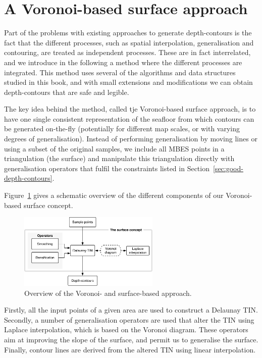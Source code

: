 %
\section{A Voronoi-based surface approach}

Part of the problems with existing approaches to generate depth-contours is the fact that the different processes, such as spatial interpolation, generalisation and contouring, are treated as independent processes.
These are in fact interrelated, and we introduce in the following a method where the different processes are integrated.
This method uses several of the algorithms and data structures studied in this book, and with small extensions and modifications we can obtain depth-contours that are safe and legible.

%

The key idea behind the method, called tje Voronoi-based surface approach, is to have one single consistent representation of the seafloor from which contours can be generated on-the-fly (potentially for different map scales, or with varying degrees of generalisation).
Instead of performing generalisation by moving lines or using a subset of the original samples, we include all MBES points in a triangulation (the surface) and manipulate this triangulation directly with generalisation operators that fulfil the constraints listed in Section~\ref{sec:good-depth-contours}.

%

Figure~\ref{fig:surfapproach} gives a schematic overview of the different components of our Voronoi-based surface concept. 
\begin{figure}
  \centering
  \includegraphics[width=0.6\textwidth]{figs/surfaceapproach_V2.pdf}
  \caption{Overview of the Voronoi- and surface-based approach.}
\label{fig:surfapproach}
\end{figure}

Firstly, all the input points of a given area are used to construct a Delaunay TIN.
Secondly, a number of generalisation operators are used that alter the TIN using Laplace interpolation, which is based on the Voronoi diagram.
These operators aim at improving the slope of the surface, and permit us to generalise the surface.
Finally, contour lines are derived from the altered TIN using linear interpolation.


